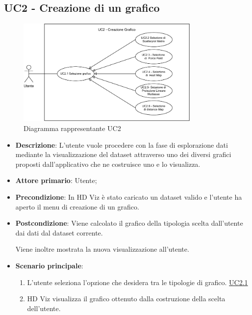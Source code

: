 \newpage

\subsection{UC2 - Creazione di un grafico}
\label{sub:uc2}

\begin{figure}[h]
    \centering
    \includegraphics[width=0.8\textwidth]{componenti/casi-duso/diagrammi/UC2.pdf}
    \caption{Diagramma rappresentante UC2}
    \label{fig:UC2}
\end{figure}


\begin{itemize}
    \item \textbf{Descrizione}: L’utente vuole procedere con la fase di esplorazione
                                dati mediante la visualizzazione del dataset
                                attraverso uno dei diversi grafici proposti dall’applicativo
                                che ne costruisce uno e lo visualizza.
	
    \item \textbf{Attore primario}: Utente;
    
    \item \textbf{Precondizione}:   In HD Viz è stato caricato un dataset valido e
									l'utente ha aperto il menu di creazione di un grafico.

    \item \textbf{Postcondizione}:  Viene calcolato il grafico della tipologia scelta dall'utente dai dati 
									dal dataset corrente. 
									
									Viene inoltre mostrata la nuova visualizzazione all'utente.

	\item \textbf{Scenario principale}:
		\begin{enumerate}
			\item L'utente seleziona l'opzione che desidera tra le tipologie di grafico. \hyperref[ssub:uc2.1]{UC2.1}
			\item HD Viz visualizza il grafico ottenuto dalla costruzione della scelta dell'utente.
		\end{enumerate}
\end{itemize}


